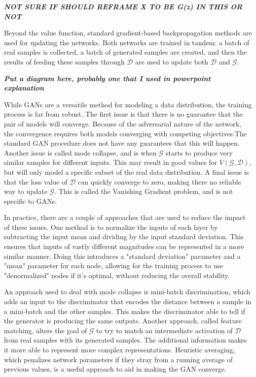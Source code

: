 \documentclass[11pt]{report}
\begin{document}
	\textit{\textbf{NOT SURE IF SHOULD REFRAME X TO BE G(z) IN THIS OR NOT}}
	\par Beyond the value function, standard gradient-based backpropagation methods are used for updating the networks. Both networks are trained in tandem: a batch of real samples is collected, a batch of generated samples are created, and then the results of feeding these samples through $\mathcal{D}$ are used to update both $\mathcal{D}$ and $\mathcal{G}$.  
	\par \textit{\textbf{Put a diagram here, probably one that I used in powerpoint explanation}}
	\par While GANs are a versatile method for modeling a data distribution, the training process is far from robust. The first issue is that there is no guarantee that the pair of models will converge. Because of the adversarial nature of the network, the convergence requires both models converging with competing objectives.The standard GAN procedure does not have any guarantees that this will happen. Another issue is called mode collapse, and is when $\mathcal{G}$ starts to produce very similar samples for different inputs. This may result in good values for $V(\mathcal{G},\mathcal{D})$, but will only model a specific subset of the real data distribution. A final issue is that the loss value of $\mathcal{D}$ can quickly converge to zero, making there no reliable way to update $\mathcal{G}$. This is called the Vanishing Gradient problem, and is not specific to GANs. 
	\par In practice, there are a couple of approaches that are used to reduce the impact of these issues. One method is to normalize the inputs of each layer by subtracting the input mean and dividing by the input standard deviation. This ensures that inputs of vastly different magnitudes can be represented in a more similar manner. Doing this introduces a "standard deviation" parameter and a "mean" parameter for each node, allowing for the training process to use "denormalized" nodes if it's optimal, without reducing the overall stability.
	\par An approach used to deal with mode collapse is mini-batch discrimination, which adds an input to the discriminator that encodes the distance between a sample in a mini-batch and the other samples. This makes the discriminator able to tell if the generator is producing the same outputs. Another approach, called feature matching, alters the goal of $\mathcal{G}$ to try to match an intermediate activation of $\mathcal{D}$ from real samples with its generated samples. The additional information makes it more able to represent more complex representations. Heuristic averaging, which penalizes network parameters if they stray from a running average of previous values, is a useful approach to aid in making the GAN converge. 
\end{document}
